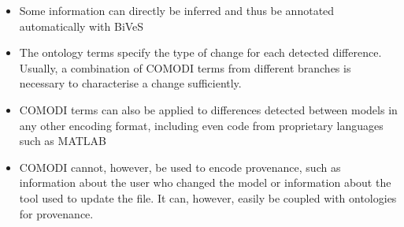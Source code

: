 \begin{itemize}
		\item Some information can directly be inferred and thus be annotated automatically with BiVeS
		\item  The ontology terms specify the type of change for each detected difference. Usually, a combination of COMODI terms from different branches is necessary to characterise a change sufficiently.
		\item COMODI terms can also be applied to differences detected between models in any other encoding format, including even code from proprietary languages such as MATLAB 
		\item COMODI cannot, however, be used to encode provenance, such as information about the user who changed the model or information about the tool used to update the file. It can, however, easily be coupled with ontologies for provenance.
	\end{itemize}